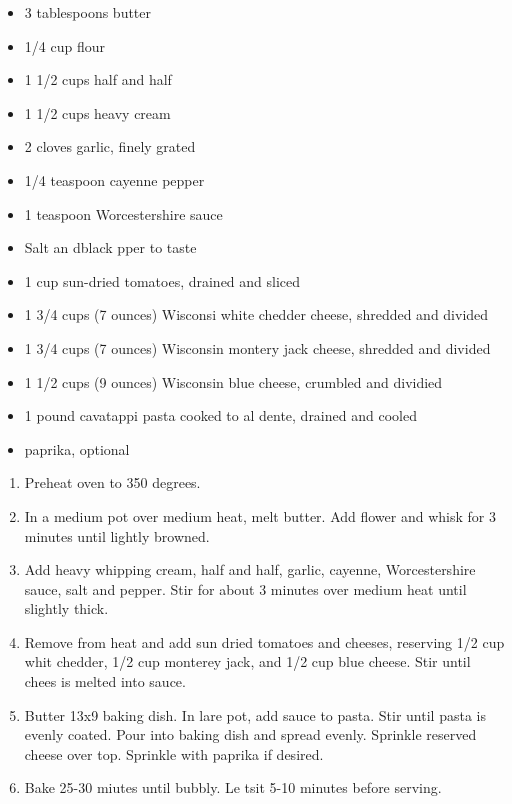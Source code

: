 \documentclass{article}
\begin{document}
\begin{framed}
    \begin{itemize}
        \item 3 tablespoons butter
        \item 1/4 cup flour
        \item 1 1/2 cups half and half
        \item 1 1/2 cups heavy cream
        \item 2 cloves garlic, finely grated
        \item 1/4 teaspoon cayenne pepper
        \item 1 teaspoon Worcestershire sauce
        \item Salt an dblack pper to taste
        \item 1 cup sun-dried tomatoes, drained and sliced
        \item 1 3/4 cups (7 ounces) Wisconsi white chedder cheese, shredded and divided
        \item 1 3/4 cups (7 ounces) Wisconsin montery jack cheese, shredded and divided
        \item 1 1/2 cups (9 ounces) Wisconsin blue cheese, crumbled and dividied
        \item 1 pound cavatappi pasta cooked to al dente, drained and cooled
        \item paprika, optional
    \end{itemize}
\end{framed}

\begin{enumerate}
    \item 
        Preheat oven to 350 degrees.
    \item 
        In a medium pot over medium heat, melt butter. Add flower and whisk for 3 minutes until lightly browned.
    \item 
        Add heavy whipping cream, half and half, garlic, cayenne, Worcestershire sauce, salt and pepper. Stir for about 3 minutes over medium heat until slightly thick.
    \item 
        Remove from heat and add sun dried tomatoes and cheeses, reserving 1/2 cup whit chedder, 1/2 cup monterey jack, and 1/2 cup blue cheese. Stir until chees is melted into sauce.
    \item 
        Butter 13x9 baking dish. In lare pot, add sauce to pasta. Stir until pasta is evenly coated. Pour into baking dish and spread evenly. Sprinkle reserved cheese over top. Sprinkle with paprika if desired.
    \item 
        Bake 25-30 miutes until bubbly. Le tsit 5-10 minutes before serving.
\end{enumerate}
\newpage
\end{document}
